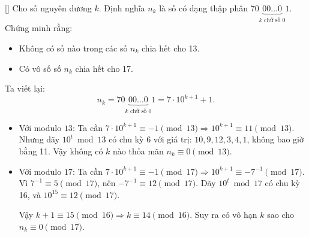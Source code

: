 \documentclass[../05-modular-arithmetic-a.tex]{subfiles}
\begin{document}
\begin{example*}\label{example:GER-2015-MO-P4}[\textbf{}]
	Cho số nguyên dương \( k \). Định nghĩa \( n_k \) là số có dạng thập phân \( 70\underbrace{00\ldots0}_{k \text{ chữ số } 0}1 \).
	Chứng minh rằng:
    \begin{itemize}[topsep=0pt, partopsep=0pt, itemsep=0pt]
        \item Không có số nào trong các số \( n_k \) chia hết cho 13.
        \item Có vô số số \( n_k \) chia hết cho 17.
    \end{itemize}
\end{example*}

\begin{story*}
    Ta viết lại:
    \[
        n_k = 70\underbrace{00\ldots0}_{k\text{ chữ số }0}1 = 7 \cdot 10^{k+1} + 1.
    \]

    \begin{itemize}[topsep=0pt, partopsep=0pt, itemsep=0pt]
        \item Với modulo \(13\): Ta cần \(7 \cdot 10^{k+1} \equiv -1 \pmod{13} \Rightarrow 10^{k+1} \equiv 11 \pmod{13}\).  
        Nhưng dãy \( 10^t \bmod{13} \) có chu kỳ 6 với giá trị: \(10, 9, 12, 3, 4, 1\), không bao giờ bằng 11.  
        Vậy không có \( k \) nào thỏa mãn \( n_k \equiv 0 \pmod{13} \).

        \item Với modulo \(17\): Ta cần \(7 \cdot 10^{k+1} \equiv -1 \pmod{17} \Rightarrow 10^{k+1} \equiv -7^{-1} \pmod{17}\).  
        Vì \( 7^{-1} \equiv 5 \pmod{17} \), nên \( -7^{-1} \equiv 12 \pmod{17} \).  
        Dãy \( 10^t \bmod{17} \) có chu kỳ 16, và \(10^{15} \equiv 12 \pmod{17}\).  

        Vậy \( k + 1 \equiv 15 \pmod{16} \Rightarrow k \equiv 14 \pmod{16} \).  
        Suy ra có vô hạn \( k \) sao cho \( n_k \equiv 0 \pmod{17} \).
    \end{itemize}
\end{story*}

\bigbreak
\end{document}
